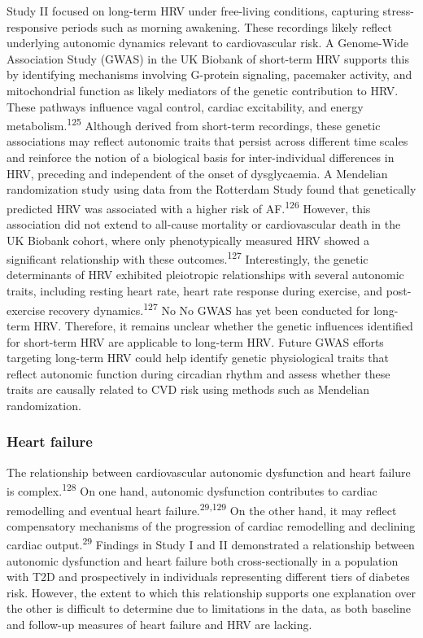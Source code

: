 \documentclass[
  a4paper,
  headsepline=true,
  open=left]{scrbook}
\begin{document}
Study II focused on long-term HRV under free-living conditions,
capturing stress-responsive periods such as morning awakening. These
recordings likely reflect underlying autonomic dynamics relevant to
cardiovascular risk. A Genome-Wide Association Study (GWAS) in the UK
Biobank of short-term HRV supports this by identifying mechanisms
involving G-protein signaling, pacemaker activity, and mitochondrial
function as likely mediators of the genetic contribution to HRV. These
pathways influence vagal control, cardiac excitability, and energy
metabolism.\textsuperscript{125} Although derived from short-term
recordings, these genetic associations may reflect autonomic traits that
persist across different time scales and reinforce the notion of a
biological basis for inter-individual differences in HRV, preceding and
independent of the onset of dysglycaemia. A Mendelian randomization
study using data from the Rotterdam Study found that genetically
predicted HRV was associated with a higher risk of
AF.\textsuperscript{126} However, this association did not extend to
all-cause mortality or cardiovascular death in the UK Biobank cohort,
where only phenotypically measured HRV showed a significant relationship
with these outcomes.\textsuperscript{127} Interestingly, the genetic
determinants of HRV exhibited pleiotropic relationships with several
autonomic traits, including resting heart rate, heart rate response
during exercise, and post-exercise recovery
dynamics.\textsuperscript{127} No No GWAS has yet been conducted for
long-term HRV. Therefore, it remains unclear whether the genetic
influences identified for short-term HRV are applicable to long-term
HRV. Future GWAS efforts targeting long-term HRV could help identify
genetic physiological traits that reflect autonomic function during
circadian rhythm and assess whether these traits are causally related to
CVD risk using methods such as Mendelian randomization.

\hypertarget{heart-failure-1}{%
\subsubsection{Heart failure}\label{heart-failure-1}}

The relationship between cardiovascular autonomic dysfunction and heart
failure is complex.\textsuperscript{128} On one hand, autonomic
dysfunction contributes to cardiac remodelling and eventual heart
failure.\textsuperscript{29,129} On the other hand, it may reflect
compensatory mechanisms of the progression of cardiac remodelling and
declining cardiac output.\textsuperscript{29} Findings in Study I and II
demonstrated a relationship between autonomic dysfunction and heart
failure both cross-sectionally in a population with T2D and
prospectively in individuals representing different tiers of diabetes
risk. However, the extent to which this relationship supports one
explanation over the other is difficult to determine due to limitations
in the data, as both baseline and follow-up measures of heart failure
and HRV are lacking.
\end{document}
